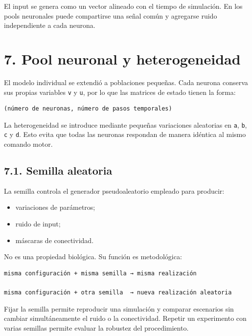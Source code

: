 \documentclass[11pt,a4paper]{article}
\providecommand{\tightlist}{%
  \setlength{\itemsep}{0pt}\setlength{\parskip}{0pt}}
\begin{document}
El input se genera como un vector alineado con el tiempo de simulación.
En los pools neuronales puede compartirse una señal común y agregarse
ruido independiente a cada neurona.

\hypertarget{pool-neuronal-y-heterogeneidad}{%
\section{7. Pool neuronal y
heterogeneidad}\label{pool-neuronal-y-heterogeneidad}}

El modelo individual se extendió a poblaciones pequeñas. Cada neurona
conserva sus propias variables \texttt{v} y \texttt{u}, por lo que las
matrices de estado tienen la forma:

\begin{lstlisting}
(número de neuronas, número de pasos temporales)
\end{lstlisting}

La heterogeneidad se introduce mediante pequeñas variaciones aleatorias
en \texttt{a}, \texttt{b}, \texttt{c} y \texttt{d}. Esto evita que todas
las neuronas respondan de manera idéntica al mismo comando motor.

\hypertarget{semilla-aleatoria}{%
\subsection{7.1. Semilla aleatoria}\label{semilla-aleatoria}}

La semilla controla el generador pseudoaleatorio empleado para producir:

\begin{itemize}
\tightlist
\item
  variaciones de parámetros;
\item
  ruido de input;
\item
  máscaras de conectividad.
\end{itemize}

No es una propiedad biológica. Su función es metodológica:

\begin{lstlisting}
misma configuración + misma semilla → misma realización

misma configuración + otra semilla  → nueva realización aleatoria
\end{lstlisting}

Fijar la semilla permite reproducir una simulación y comparar escenarios
sin cambiar simultáneamente el ruido o la conectividad. Repetir un
experimento con varias semillas permite evaluar la robustez del
procedimiento.
\end{document}
